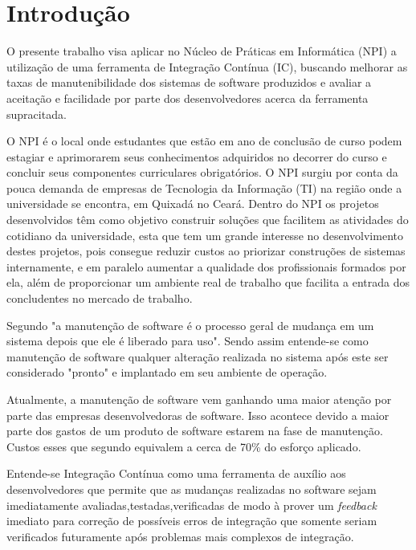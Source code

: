 \chapter*[Introdução]{Introdução}

O presente trabalho visa aplicar no Núcleo de Práticas em Informática (NPI) a utilização de uma ferramenta de Integração Contínua (IC), buscando melhorar as taxas de manutenibilidade dos sistemas de software produzidos e avaliar a aceitação e facilidade por parte dos desenvolvedores acerca da ferramenta supracitada.

O NPI é o local onde estudantes que estão em ano de conclusão de curso podem estagiar e aprimorarem seus conhecimentos adquiridos no decorrer do curso e concluir seus componentes curriculares obrigatórios. O NPI surgiu por conta da pouca demanda de empresas de Tecnologia da Informação (TI) na região onde a universidade se encontra, em Quixadá no Ceará. Dentro do NPI os projetos desenvolvidos têm como objetivo construir soluções que facilitem as atividades do cotidiano da universidade, esta que tem um grande interesse no desenvolvimento destes projetos, pois consegue reduzir custos ao priorizar construções de sistemas internamente, e em paralelo aumentar a qualidade dos profissionais formados por ela, além de proporcionar um ambiente real de trabalho que facilita a entrada dos concludentes no mercado de trabalho. \cite{npi2013}

Segundo  "a manutenção de software é o processo geral de mudança em um sistema depois que ele é liberado para uso". Sendo assim entende-se como manutenção de software  qualquer alteração realizada no sistema após este ser considerado "pronto" e implantado em seu ambiente de operação.

Atualmente, a manutenção de software vem ganhando uma maior atenção por parte das empresas desenvolvedoras de software. Isso acontece devido a maior parte dos gastos de um produto de software estarem na fase de manutenção. Custos esses que segundo  equivalem a  cerca de 70\% do esforço aplicado.

Entende-se Integração Contínua como uma ferramenta de auxílio aos desenvolvedores que permite que as mudanças realizadas no software sejam imediatamente avaliadas,testadas,verificadas de modo à prover um  \textit{feedback} imediato para correção de possíveis erros de integração que somente seriam verificados futuramente após problemas mais complexos de integração\cite{paul2007}.

